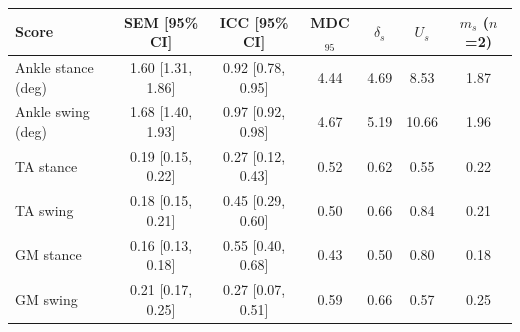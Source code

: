 \begin{tabular}{lcccccc}
\toprule
Score & SEM [95\% CI] & ICC [95\% CI] & MDC$_{95}$ & $\delta_s$ & $U_s$ & $m_s$ ($n$=2) \\
\midrule
Ankle stance (deg) & 1.60 [1.31, 1.86] & 0.92 [0.78, 0.95] & 4.44 & 4.69 & 8.53 & 1.87 \\
Ankle swing (deg) & 1.68 [1.40, 1.93] & 0.97 [0.92, 0.98] & 4.67 & 5.19 & 10.66 & 1.96 \\
TA stance & 0.19 [0.15, 0.22] & 0.27 [0.12, 0.43] & 0.52 & 0.62 & 0.55 & 0.22 \\
TA swing & 0.18 [0.15, 0.21] & 0.45 [0.29, 0.60] & 0.50 & 0.66 & 0.84 & 0.21 \\
GM stance & 0.16 [0.13, 0.18] & 0.55 [0.40, 0.68] & 0.43 & 0.50 & 0.80 & 0.18 \\
GM swing & 0.21 [0.17, 0.25] & 0.27 [0.07, 0.51] & 0.59 & 0.66 & 0.57 & 0.25 \\
\bottomrule
\end{tabular}
